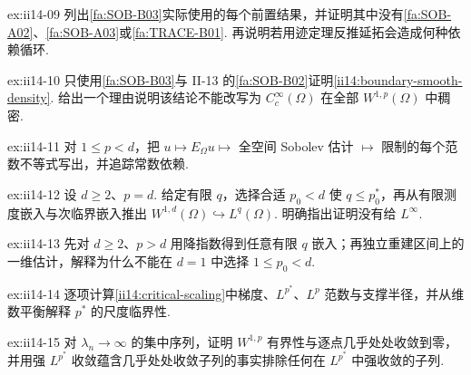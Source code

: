 \begin{FAExercise}[Sobolev延拓的依赖审计]{ex:ii14-09}
列出\autoref{fa:SOB-B03}实际使用的每个前置结果，并证明其中没有\autoref{fa:SOB-A02}、\autoref{fa:SOB-A03}或\autoref{fa:TRACE-B01}. 再说明若用迹定理反推延拓会造成何种依赖循环.
\end{FAExercise}

\begin{FAExercise}[边界光滑稠密性]{ex:ii14-10}
只使用\autoref{fa:SOB-B03}与 II-13 的\autoref{fa:SOB-B02}证明\autoref{ii14:boundary-smooth-density}. 给出一个理由说明该结论不能改写为 \(\displaystyle C_c^\infty(\Omega)\) 在全部 \(\displaystyle W^{1,p}(\Omega)\) 中稠密.
\end{FAExercise}

\begin{FAExercise}{ex:ii14-11}
对 \(\displaystyle1\leqslant p<d\)，把 \(\displaystyle u\mapsto E_\Omega u\mapsto\) 全空间 Sobolev 估计 \(\displaystyle\mapsto\) 限制的每个范数不等式写出，并追踪常数依赖.
\end{FAExercise}

\begin{FAExercise}[\(\displaystyle p=d\) 有限 \(\displaystyle q\) 嵌入]{ex:ii14-12}
设 \(\displaystyle d\geqslant2\)、\(\displaystyle p=d\). 给定有限 \(\displaystyle q\)，选择合适 \(\displaystyle p_0<d\) 使 \(\displaystyle q\leqslant p_0^*\)，再从有限测度嵌入与次临界嵌入推出 \(\displaystyle W^{1,d}(\Omega)\hookrightarrow L^q(\Omega)\). 明确指出证明没有给 \(\displaystyle L^\infty\).
\end{FAExercise}

\begin{FAExercise}[\(\displaystyle p>d\) 与 \(\displaystyle d=1\)]{ex:ii14-13}
先对 \(\displaystyle d\geqslant2\)、\(\displaystyle p>d\) 用降指数得到任意有限 \(\displaystyle q\) 嵌入；再独立重建区间上的一维估计，解释为什么不能在 \(\displaystyle d=1\) 中选择 \(\displaystyle1\leqslant p_0<d\).
\end{FAExercise}

\begin{FAExercise}[临界缩放]{ex:ii14-14}
逐项计算\autoref{ii14:critical-scaling}中梯度、\(\displaystyle L^{p^*}\)、\(\displaystyle L^p\) 范数与支撑半径，并从维数平衡解释 \(\displaystyle p^*\) 的尺度临界性.
\end{FAExercise}

\begin{FAExercise}{ex:ii14-15}
对 \(\displaystyle\lambda_n\to\infty\) 的集中序列，证明 \(\displaystyle W^{1,p}\) 有界性与逐点几乎处处收敛到零，并用强 \(\displaystyle L^{p^*}\) 收敛蕴含几乎处处收敛子列的事实排除任何在 \(\displaystyle L^{p^*}\) 中强收敛的子列.
\end{FAExercise}


